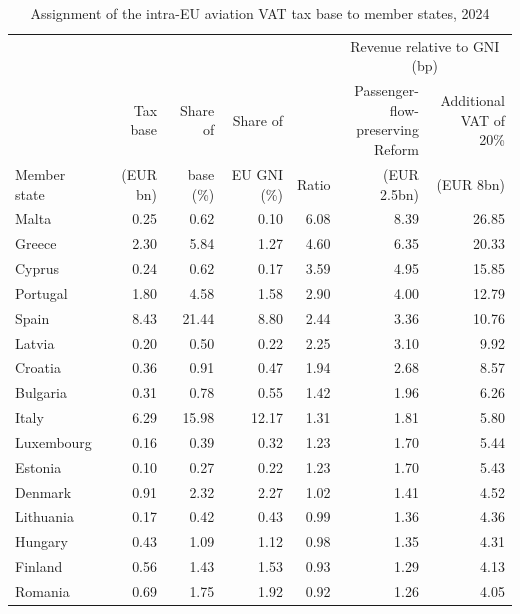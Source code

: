 \documentclass[../../main]{subfiles}
\begin{document}
\begin{table}[htbp]
\centering
\caption{Assignment of the intra-EU aviation VAT tax base to member states, 2024}
\label{tab:vat_base_ms}
\small
\begin{tabular}{lrrrrrr}
\toprule
 & & & & & \multicolumn{2}{c}{Revenue relative to GNI (bp)} \\
\cmidrule(lr){6-7}
 & Tax base & Share of & Share of & & \makecell{Passenger-\\flow-\\preserving\\ Reform} & \makecell{Additional\\VAT of 20\%}\\
Member state & (EUR bn) & base (\%) & EU GNI (\%) & Ratio & (EUR 2.5bn) & (EUR 8bn) \\
\midrule
Malta          &   0.25 &   0.62 &   0.10 &   6.08 &   8.39 &  26.85 \\
Greece         &   2.30 &   5.84 &   1.27 &   4.60 &   6.35 &  20.33 \\
Cyprus         &   0.24 &   0.62 &   0.17 &   3.59 &   4.95 &  15.85 \\
Portugal       &   1.80 &   4.58 &   1.58 &   2.90 &   4.00 &  12.79 \\
Spain          &   8.43 &  21.44 &   8.80 &   2.44 &   3.36 &  10.76 \\
Latvia         &   0.20 &   0.50 &   0.22 &   2.25 &   3.10 &   9.92 \\
Croatia        &   0.36 &   0.91 &   0.47 &   1.94 &   2.68 &   8.57 \\
Bulgaria       &   0.31 &   0.78 &   0.55 &   1.42 &   1.96 &   6.26 \\
Italy          &   6.29 &  15.98 &  12.17 &   1.31 &   1.81 &   5.80 \\
Luxembourg     &   0.16 &   0.39 &   0.32 &   1.23 &   1.70 &   5.44 \\
Estonia        &   0.10 &   0.27 &   0.22 &   1.23 &   1.70 &   5.43 \\
Denmark        &   0.91 &   2.32 &   2.27 &   1.02 &   1.41 &   4.52 \\
Lithuania      &   0.17 &   0.42 &   0.43 &   0.99 &   1.36 &   4.36 \\
Hungary        &   0.43 &   1.09 &   1.12 &   0.98 &   1.35 &   4.31 \\
Finland        &   0.56 &   1.43 &   1.53 &   0.93 &   1.29 &   4.13 \\
Romania        &   0.69 &   1.75 &   1.92 &   0.92 &   1.26 &   4.05 \\

\end{tabular}
\end{table}
\end{document}
